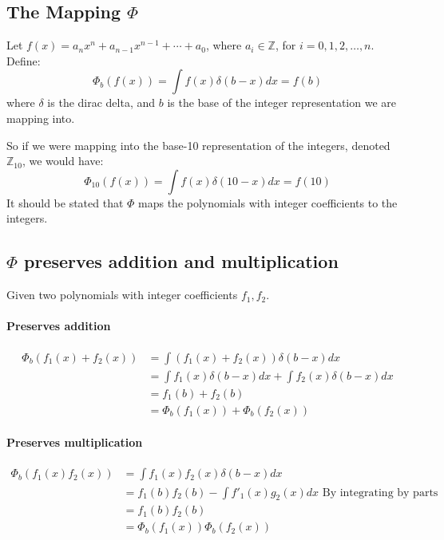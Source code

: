 \documentclass[12pt]{article}
\begin{document}
\begin{appendices}
\section*{The Mapping $\Phi$}

Let $f(x) = a_n x^n +a_{n-1} x^{n-1} + \cdots + a_0$, where $a_i \in \mathbb{Z}$, for $i=0, 1, 2, \ldots, n$.\\

Define:
$$
\Phi_b(f(x)) = \int f(x) \delta(b-x)dx = f(b)
$$
where $\delta$ is the dirac delta, and $b$ is the base of the integer representation we are mapping into.

So if we were mapping into the base-10 representation of the integers, denoted $\mathbb{Z}_{10}$, we would have:
$$
\Phi_{10}(f(x))  = \int f(x) \delta(10-x) dx = f(10)
$$
It should be stated that $\Phi$ maps the polynomials with integer coefficients to the integers.

\subsection*{$\Phi$ preserves addition and multiplication}

Given two polynomials with integer coefficients $f_1, f_2$.
\paragraph*{Preserves addition}
\begin{align*}
\Phi_b(f_1(x)+f_2(x)) &= \int (f_1(x) + f_2(x)) \delta(b-x) dx \\
&= \int f_1(x) \delta(b-x) dx + \int f_2(x) \delta(b-x) dx \\
&= f_1(b) + f_2(b)\\
&= \Phi_b(f_1(x)) + \Phi_b(f_2(x))
\end{align*}

\paragraph{Preserves multiplication}
\begin{align*}
\Phi_b(f_1(x) f_2(x)) &= \int f_1(x) f_2(x) \delta(b-x) dx \\
&= f_1(b) f_2(b) - \int f'_1(x) g_2(x)dx \text{ By integrating by parts }\\
&= f_1(b) f_2(b)\\
&= \Phi_b(f_1(x)) \Phi_b(f_2(x))
\end{align*}


\end{appendices}
\end{document}
